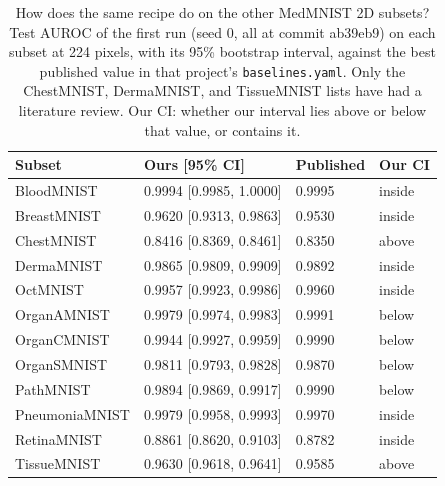\begin{table}[t]
\caption{How does the same recipe do on the other MedMNIST 2D subsets? Test AUROC of the first run (seed 0, all at commit ab39eb9) on each subset at 224 pixels, with its 95\% bootstrap interval, against the best published value in that project's \texttt{baselines.yaml}. Only the ChestMNIST, DermaMNIST, and TissueMNIST lists have had a literature review. Our CI: whether our interval lies above or below that value, or contains it.}
\label{tab:subsets}
\centering
\footnotesize
\setlength{\tabcolsep}{3pt}
\begin{tabular}{@{}llll@{}}
\toprule
Subset & Ours [95\% CI] & Published & Our CI \\
\midrule
BloodMNIST & 0.9994 [0.9985, 1.0000] & 0.9995 & inside \\
BreastMNIST & 0.9620 [0.9313, 0.9863] & 0.9530 & inside \\
ChestMNIST & 0.8416 [0.8369, 0.8461] & 0.8350 & above \\
DermaMNIST & 0.9865 [0.9809, 0.9909] & 0.9892 & inside \\
OctMNIST & 0.9957 [0.9923, 0.9986] & 0.9960 & inside \\
OrganAMNIST & 0.9979 [0.9974, 0.9983] & 0.9991 & below \\
OrganCMNIST & 0.9944 [0.9927, 0.9959] & 0.9990 & below \\
OrganSMNIST & 0.9811 [0.9793, 0.9828] & 0.9870 & below \\
PathMNIST & 0.9894 [0.9869, 0.9917] & 0.9990 & below \\
PneumoniaMNIST & 0.9979 [0.9958, 0.9993] & 0.9970 & inside \\
RetinaMNIST & 0.8861 [0.8620, 0.9103] & 0.8782 & inside \\
TissueMNIST & 0.9630 [0.9618, 0.9641] & 0.9585 & above \\
\bottomrule
\end{tabular}
\end{table}
